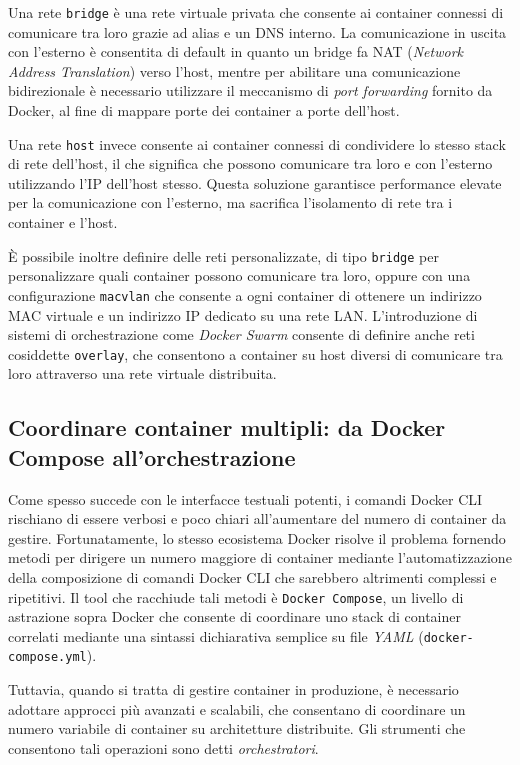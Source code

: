 Una rete \texttt{bridge} è una rete virtuale privata che consente ai container connessi di comunicare tra loro grazie ad alias e un DNS interno. La comunicazione in uscita con l'esterno è consentita di default in quanto un bridge fa NAT (\emph{Network Address Translation}) verso l'host, mentre per abilitare una comunicazione bidirezionale è necessario utilizzare il meccanismo di \emph{port forwarding} fornito da Docker, al fine di mappare porte dei container a porte dell'host.

Una rete \texttt{host} invece consente ai container connessi di condividere lo stesso stack di rete dell'host, il che significa che possono comunicare tra loro e con l'esterno utilizzando l'IP dell'host stesso. Questa soluzione garantisce performance elevate per la comunicazione con l'esterno, ma sacrifica l'isolamento di rete tra i container e l'host.

È possibile inoltre definire delle reti personalizzate, di tipo \texttt{bridge} per personalizzare quali container possono comunicare tra loro, oppure con una configurazione \texttt{macvlan} che consente a ogni container di ottenere un indirizzo MAC virtuale e un indirizzo IP dedicato su una rete LAN. L'introduzione di sistemi di orchestrazione come \emph{Docker Swarm} consente di definire anche reti cosiddette \texttt{overlay}, che consentono a container su host diversi di comunicare tra loro attraverso una rete virtuale distribuita.

\subsection{Coordinare container multipli: da Docker Compose all'orchestrazione}
Come spesso succede con le interfacce testuali potenti, i comandi Docker CLI rischiano di essere verbosi e poco chiari all'aumentare del numero di container da gestire. Fortunatamente, lo stesso ecosistema Docker risolve il problema fornendo metodi per dirigere un numero maggiore di container mediante l'automatizzazione della composizione di comandi Docker CLI che sarebbero altrimenti complessi e ripetitivi.
Il tool che racchiude tali metodi è \texttt{Docker Compose}, un livello di astrazione sopra Docker che consente di coordinare uno stack di container correlati mediante una sintassi dichiarativa semplice su file \emph{YAML} (\texttt{docker-compose.yml}).

Tuttavia, quando si tratta di gestire container in produzione, è necessario adottare approcci più avanzati e scalabili, che consentano di coordinare un numero variabile di container su architetture distribuite. Gli strumenti che consentono tali operazioni sono detti \emph{orchestratori}.

